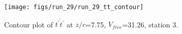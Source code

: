 \begin{figure}[H]
\centering
\texttt{[image: figs/run\_29/run\_29\_tt\_contour]}
\caption{Contour plot of $\overline{t^\prime t^\prime}$ at $z/c$=7.75, $V_{free}$=31.26, station 3.}
\label{fig:run_29_tt_contour}
\end{figure}


